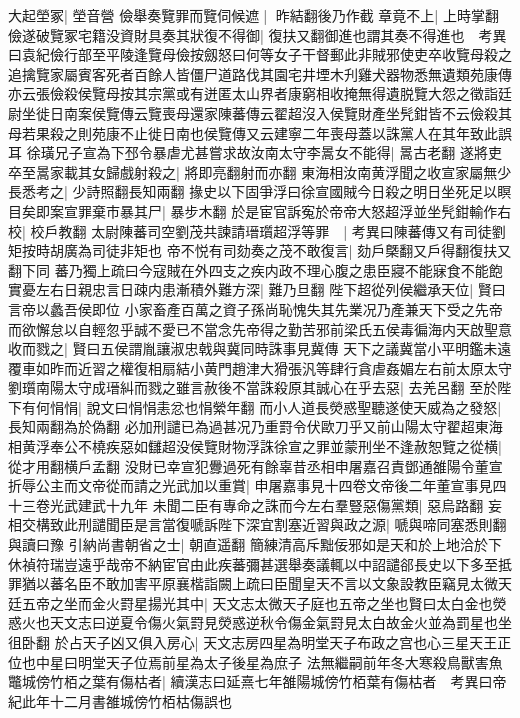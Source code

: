 大起塋冢|{
	塋音營}
儉舉奏覽罪而覽伺候遮|{
	昨結翻後乃作截}
章竟不上|{
	上時掌翻}
儉遂破覽冢宅籍没資財具奏其狀復不得御|{
	復扶又翻御進也謂其奏不得進也　考異曰袁紀儉行部至平陵逢覽母儉按劔怒曰何等女子干督郵此非賊邪使吏卒收覽母殺之追擒覽家屬賓客死者百餘人皆僵尸道路伐其園宅井堙木刋雞犬器物悉無遺類苑康傳亦云張儉殺侯覽母按其宗黨或有迸匿太山界者康窮相收掩無得遺脱覽大怨之徵詣廷尉坐徙日南案侯覽傳云覽喪母還家陳蕃傳云翟超沒入侯覽財產坐髠鉗皆不云儉殺其母若果殺之則苑康不止徙日南也侯覽傳又云建寧二年喪母蓋以誅黨人在其年致此誤耳}
徐璜兄子宣為下邳令暴虐尤甚嘗求故汝南太守李暠女不能得|{
	暠古老翻}
遂將吏卒至暠家載其女歸戲射殺之|{
	將即亮翻射而亦翻}
東海相汝南黄浮聞之收宣家屬無少長悉考之|{
	少詩照翻長知兩翻}
掾史以下固爭浮曰徐宣國賊今日殺之明日坐死足以瞑目矣即案宣罪棄市暴其尸|{
	暴步木翻}
於是宦官訴寃於帝帝大怒超浮並坐髠鉗輸作右校|{
	校戶教翻}
太尉陳蕃司空劉茂共諫請瑨瓆超浮等罪　|{
	考異曰陳蕃傳又有司徒劉矩按時胡廣為司徒非矩也}
帝不悦有司劾奏之茂不敢復言|{
	劾戶槩翻又戶得翻復扶又翻下同}
蕃乃獨上疏曰今寇賊在外四支之疾内政不理心腹之患臣寢不能寐食不能飽實憂左右日親忠言日疎内患漸積外難方深|{
	難乃旦翻}
陛下超從列侯繼承天位|{
	賢曰言帝以蠡吾侯即位}
小家畜產百萬之資子孫尚恥愧失其先業况乃產兼天下受之先帝而欲懈怠以自輕忽乎誠不愛已不當念先帝得之勤苦邪前梁氏五侯毒徧海内天啟聖意收而戮之|{
	賢曰五侯謂胤讓淑忠戟與冀同時誅事見冀傳}
天下之議冀當小平明鑑未遠覆車如昨而近習之權復相扇結小黄門趙津大猾張汎等肆行貪虐姦媚左右前太原太守劉瓆南陽太守成瑨糾而戮之雖言赦後不當誅殺原其誠心在乎去惡|{
	去羌呂翻}
至於陛下有何悁悁|{
	說文曰悁悁恚忿也悁縈年翻}
而小人道長熒惑聖聽遂使天威為之發怒|{
	長知兩翻為於偽翻}
必加刑譴已為過甚况乃重罸令伏歐刀乎又前山陽太守翟超東海相黄浮奉公不橈疾惡如讎超没侯覽財物浮誅徐宣之罪並蒙刑坐不逢赦恕覽之從横|{
	從才用翻横戶孟翻}
没財已幸宣犯釁過死有餘辜昔丞相申屠嘉召責鄧通雒陽令董宣折辱公主而文帝從而請之光武加以重賞|{
	申屠嘉事見十四卷文帝後二年董宣事見四十三卷光武建武十九年}
未聞二臣有專命之誅而今左右羣豎惡傷黨類|{
	惡烏路翻}
妄相交構致此刑譴聞臣是言當復嗁訴陛下深宜割塞近習與政之源|{
	嗁與啼同塞悉則翻與讀曰豫}
引納尚書朝省之士|{
	朝直遥翻}
簡練清高斥黜佞邪如是天和於上地洽於下休禎符瑞豈遠乎哉帝不納宦官由此疾蕃彌甚選舉奏議輒以中詔譴郤長史以下多至抵罪猶以蕃名臣不敢加害平原襄楷詣闕上疏曰臣聞皇天不言以文象設教臣竊見太微天廷五帝之坐而金火罸星揚光其中|{
	天文志太微天子庭也五帝之坐也賢曰太白金也熒惑火也天文志曰逆夏令傷火氣罸見熒惑逆秋令傷金氣罸見太白故金火並為罰星也坐徂卧翻}
於占天子凶又俱入房心|{
	天文志房四星為明堂天子布政之宫也心三星天王正位也中星曰明堂天子位焉前星為太子後星為庶子}
法無繼嗣前年冬大寒殺鳥獸害魚鼈城傍竹栢之葉有傷枯者|{
	續漢志曰延熹七年雒陽城傍竹栢葉有傷枯者　考異曰帝紀此年十二月書雒城傍竹栢枯傷誤也}
